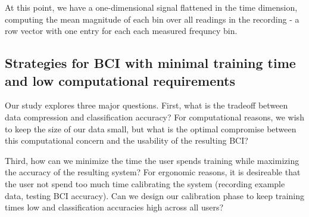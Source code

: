 



At this point, we have a one-dimensional signal flattened in the time dimension, computing the mean magnitude of each bin over all readings in the recording - a row vector with one entry for each each measured frequncy bin. 

\subsection{Strategies for BCI with minimal training time and low computational requirements}

Our study explores three major questions. First, what is the tradeoff between data compression and classification accuracy? For computational reasons, we wish to keep the size of our data small, but what is the optimal compromise between this computational concern and the usability of the resulting BCI?


Third, how can we minimize the time the user spends training while maximizing the accuracy of the resulting system? For ergonomic reasons, it is desireable that the user not spend too much time calibrating the system (recording example data, testing BCI accuracy). Can we design our calibration phase to keep training times low and classification accuracies high across all users?

